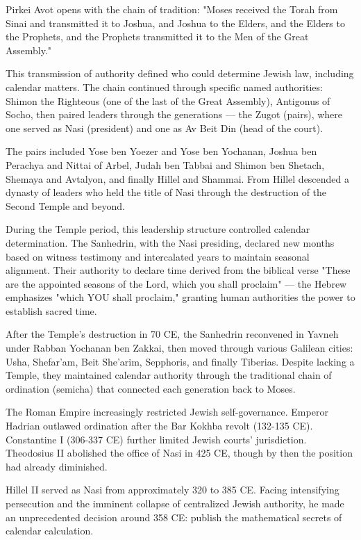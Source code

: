 \begin{historical}
Pirkei Avot opens with the chain of tradition: "Moses received the Torah from Sinai and transmitted it to Joshua, and Joshua to the Elders, and the Elders to the Prophets, and the Prophets transmitted it to the Men of the Great Assembly."

This transmission of authority defined who could determine Jewish law, including calendar matters. The chain continued through specific named authorities: Shimon the Righteous (one of the last of the Great Assembly), Antigonus of Socho, then paired leaders through the generations — the Zugot (pairs), where one served as Nasi (president) and one as Av Beit Din (head of the court).

The pairs included Yose ben Yoezer and Yose ben Yochanan, Joshua ben Perachya and Nittai of Arbel, Judah ben Tabbai and Shimon ben Shetach, Shemaya and Avtalyon, and finally Hillel and Shammai. From Hillel descended a dynasty of leaders who held the title of Nasi through the destruction of the Second Temple and beyond.

During the Temple period, this leadership structure controlled calendar determination. The Sanhedrin, with the Nasi presiding, declared new months based on witness testimony and intercalated years to maintain seasonal alignment. Their authority to declare time derived from the biblical verse "These are the appointed seasons of the Lord, which you shall proclaim" — the Hebrew emphasizes "which YOU shall proclaim," granting human authorities the power to establish sacred time.

After the Temple's destruction in 70 CE, the Sanhedrin reconvened in Yavneh under Rabban Yochanan ben Zakkai, then moved through various Galilean cities: Usha, Shefar'am, Beit She'arim, Sepphoris, and finally Tiberias. Despite lacking a Temple, they maintained calendar authority through the traditional chain of ordination (semicha) that connected each generation back to Moses.

The Roman Empire increasingly restricted Jewish self-governance. Emperor Hadrian outlawed ordination after the Bar Kokhba revolt (132-135 CE). Constantine I (306-337 CE) further limited Jewish courts' jurisdiction. Theodosius II abolished the office of Nasi in 425 CE, though by then the position had already diminished.

Hillel II served as Nasi from approximately 320 to 385 CE. Facing intensifying persecution and the imminent collapse of centralized Jewish authority, he made an unprecedented decision around 358 CE: publish the mathematical secrets of calendar calculation.


\end{historical}
